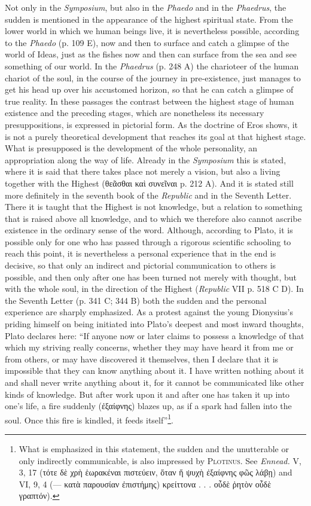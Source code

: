 \documentclass[12pt,a4paper,openany]{book}
\newcommand{\opage}[1]{\marginnote{\footnotesize\textit{[#1]}}}
\begin{document}
Not only in the \textit{Symposium}, but also in the \textit{Phaedo} and in the \textit{Phaedrus}, the sudden is mentioned
in the appearance of the highest spiritual state.  From the lower world in which we
human beings live, it is nevertheless possible, according to the \textit{Phaedo} (p. 109 E),
now and then to surface and catch a glimpse of
the world of Ideas, just as the fishes now and then can surface
from the sea and see something of our world.  In the \textit{Phaedrus}
(p. 248 A) the charioteer of the human chariot of the soul,
in the course of the journey in pre-existence, just manages to get his head up
\setcounter{footnote}{0}%
\opage{49}over his accustomed horizon, so that he can catch a glimpse of true
reality.  In these passages the contrast between the highest stage of human
existence and the preceding stages, which are nonetheless its necessary
presuppositions, is expressed in pictorial form.  As the doctrine of Eros shows,
it is not a purely theoretical development that reaches its goal
at that highest stage.  What is presupposed is the development of the whole personality,
an appropriation along the way of life.  Already in the \textit{Symposium}
this is stated, where it is said that there takes place not merely a
vision, but also a living together with the Highest (θεᾶσθαι
καὶ συνεῖναι p. 212 A).  And it is stated still more definitely in
the seventh book of the \textit{Republic} and in the Seventh Letter.  There it is taught
that the Highest is not knowledge, but a relation to something
that is raised above all knowledge, and to which we therefore also
cannot ascribe existence in the ordinary sense of the word.
Although, according to Plato, it is possible only for one who has
passed through a rigorous scientific schooling to reach this
point, it is nevertheless a personal experience that in the end
is decisive, so that only an indirect and pictorial communication
to others is possible, and then only after one has been turned
not merely with thought, but with the whole soul, in
the direction of the Highest (\textit{Republic} VII p. 518 C D).  In the Seventh
Letter (p. 341 C; 344 B) both the
sudden and the personal experience are sharply emphasized.  As a protest
against the young Dionysius's priding himself on being initiated
into Plato's deepest and most inward thoughts, Plato declares
here: ``If anyone now or later claims to possess
a knowledge of that which my striving really concerns, whether
they may have heard it from me or from others,
or may have discovered it themselves, then I declare that it is
impossible that they can know anything about it.  I have written nothing
about it and shall never write anything about it, for
\setcounter{footnote}{0}%
\opage{50}it cannot be communicated like other kinds of knowledge.  But after
work upon it and after one has taken it up into one's life,
a fire suddenly (ἐξαίφνης) blazes up, as if a
spark had fallen into the soul.  Once this fire is kindled,
it feeds itself''\footnote[1]{What is emphasized in this statement, the sudden and the unutterable or only indirectly communicable, is also impressed by \textsc{Plotinus}.  See \textit{Ennead.} V, 3, 17 (τότε δὲ χρὴ ἑωρακέναι πιστεύειν, ὅταν ἥ ψυχὴ ἐξαίφνης φῶς λάβῃ) and VI, 9, 4 (--- κατὰ παρουσίαν ἐπιστήμης) κρείττονα . . . οὖδὲ ῥητὸν οὖδὲ γραπτόν).}.
\end{document}
